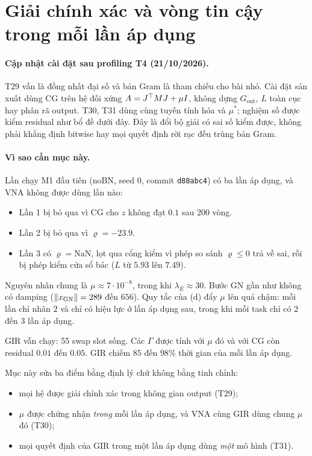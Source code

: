 \section{Giải chính xác và vòng tin cậy trong mỗi lần áp dụng}\label{sec:exact}

\paragraph{Cập nhật cài đặt sau profiling T4 (21/10/2026).}
T29 vẫn là đồng nhất đại số và bản Gram là tham chiếu cho bài nhỏ.
Cài đặt sản xuất dùng CG trên hệ đối xứng $A=J^{\top} MJ+\mu I$,
không dựng $G_{\mathrm{out}}$, $L$ toàn cục hay phân rã output.
T30, T31 dùng cùng tuyến tính hóa và $\mu^*$; nghiệm số được kiểm residual
như bổ đề dưới đây. Đây là đổi bộ giải có sai số kiểm được, không phải
khẳng định bitwise hay mọi quyết định rời rạc đều trùng bản Gram.


\paragraph{Vì sao cần mục này.} Lần chạy M1 đầu tiên (noBN, seed 0, commit \texttt{d88abc4}) có ba lần áp dụng, và VNA không được dùng lần nào:
\begin{itemize}
\item Lần 1 bị bỏ qua vì CG cho $z$ không đạt $0.1$ sau 200 vòng.
\item Lần 2 bị bỏ qua vì $\varrho=-23.9$.
\item Lần 3 có $\varrho=\mathrm{NaN}$, lọt qua cổng kiểm vì phép so sánh $\varrho\le0$ trả về sai, rồi bị phép kiểm cửa sổ bác ($L$ từ $5.93$ lên $7.49$).
\end{itemize}
Nguyên nhân chung là $\mu\approx7\cdot10^{-8}$, trong khi $\lambda_E\approx30$. Bước GN gần như không có damping ($\lVert x_{\mathrm{GN}}\rVert=289$ đến $656$). Quy tắc của (d) đẩy $\mu$ lên quá chậm: mỗi lần chỉ nhân $2$ và chỉ có hiệu lực ở lần áp dụng sau, trong khi mỗi task chỉ có $2$ đến $3$ lần áp dụng.

GIR vẫn chạy: 55 swap slot sống. Các $\Gamma$ được tính với $\mu$ đó và với CG còn residual $0.01$ đến $0.05$. GIR chiếm $85$ đến $98\%$ thời gian của mỗi lần áp dụng.

Mục này sửa ba điểm bằng định lý chứ không bằng tinh chỉnh:
\begin{itemize}
\item mọi hệ được giải chính xác trong không gian output (T29);
\item $\mu$ được chứng nhận \emph{trong} mỗi lần áp dụng, và VNA cùng GIR dùng chung $\mu$ đó (T30);
\item mọi quyết định của GIR trong một lần áp dụng dùng \emph{một} mô hình (T31).
\end{itemize}

